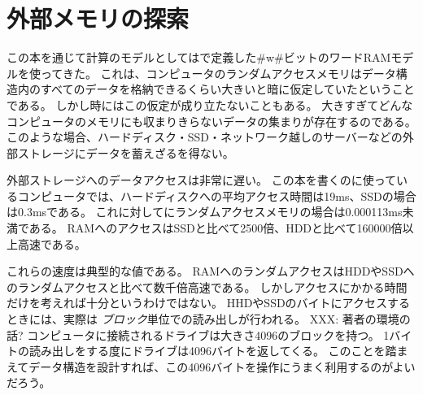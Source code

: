 \chapter{外部メモリの探索}
この本を通じて計算のモデルとしてはで定義した#w#ビットのワードRAMモデルを使ってきた。
これは、コンピュータのランダムアクセスメモリはデータ構造内のすべてのデータを格納できるくらい大きいと暗に仮定していたということである。
しかし時にはこの仮定が成り立たないこともある。
大きすぎてどんなコンピュータのメモリにも収まりきらないデータの集まりが存在するのである。
このような場合、ハードディスク・SSD・ネットワーク越しのサーバーなどの外部ストレージにデータを蓄えざるを得ない。

%
%
%
%
外部ストレージへのデータアクセスは非常に遅い。
この本を書くのに使っているコンピュータでは、ハードディスクへの平均アクセス時間は19ms、SSDの場合は0.3msである。
これに対してにランダムアクセスメモリの場合は0.000113ms未満である。
RAMへのアクセスはSSDと比べて2500倍、HDDと比べて160000倍以上高速である。

% 
% 

これらの速度は典型的な値である。
RAMへのランダムアクセスはHDDやSSDへのランダムアクセスと比べて数千倍高速である。
しかしアクセスにかかる時間だけを考えれば十分というわけではない。
HHDやSSDのバイトにアクセスするときには、実際は
\emph{ブロック}単位での読み出しが行われる。
%
XXX: 著者の環境の話?
コンピュータに接続されるドライブは大きさ4096のブロックを持つ。
1バイトの読み出しをする度にドライブは4096バイトを返してくる。
このことを踏まえてデータ構造を設計すれば、この4096バイトを操作にうまく利用するのがよいだろう。


